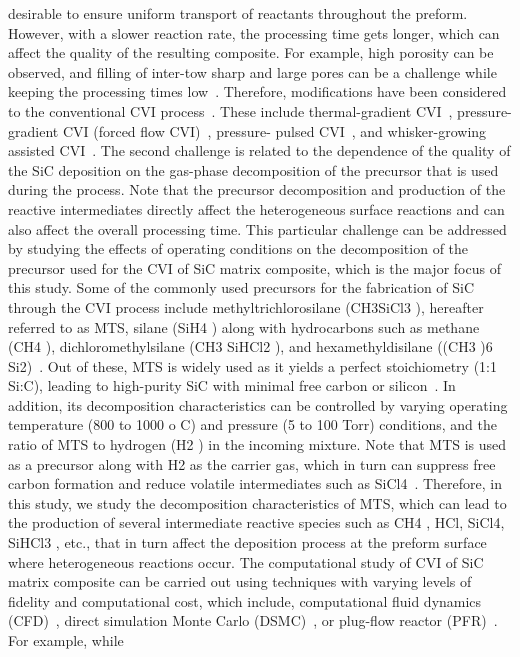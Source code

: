 \documentclass[final, letterpaper, square, comma, numbers, sort&compress]{elsarticle}
\begin{document}
desirable to ensure uniform transport of reactants throughout the preform. However, with a slower reaction
rate, the processing time gets longer, which can affect the quality of the resulting composite. For example,
high porosity can be observed, and filling of inter-tow sharp and large pores can be a challenge while keeping
the processing times low~\cite{Liu2021}. Therefore, modifications have been considered to the conventional CVI process~\cite{Lamon2005,Probst1999}. These include thermal-gradient CVI~\cite{Stinton1986}, pressure-gradient CVI (forced flow CVI)~\cite{Deck2013}, pressure-
pulsed CVI~\cite{Naslain2001}, and whisker-growing assisted CVI~\cite{Oh2001}. The second challenge is related to the dependence
of the quality of the SiC deposition on the gas-phase decomposition of the precursor that is used during the
process. Note that the precursor decomposition and production of the reactive intermediates directly affect
the heterogeneous surface reactions and can also affect the overall processing time. This particular challenge
can be addressed by studying the effects of operating conditions on the decomposition of the precursor used
for the CVI of SiC matrix composite, which is the major focus of this study.
Some of the commonly used precursors for the fabrication of SiC through the CVI process include
methyltrichlorosilane (CH3SiCl3 ), hereafter referred to as MTS, silane (SiH4 ) along with hydrocarbons such
as methane (CH4 ), dichloromethylsilane (CH3 SiHCl2 ), and hexamethyldisilane ((CH3 )6 Si2)~\cite{Noda1992,Naslain2006,Lazzeri2012}. Out
of these, MTS is widely used as it yields a perfect stoichiometry (1:1 Si:C), leading to high-purity SiC
with minimal free carbon or silicon~\cite{Lamon2005}. In addition, its decomposition characteristics can be controlled by
varying operating temperature (800 to 1000 o C) and pressure (5 to 100 Torr) conditions, and the ratio of
MTS to hydrogen (H2 ) in the incoming mixture. Note that MTS is used as a precursor along with H2 as
the carrier gas, which in turn can suppress free carbon formation and reduce volatile intermediates such as
SiCl4~\cite{Lazzeri2012}. Therefore, in this study, we study the decomposition characteristics of MTS, which can lead to
the production of several intermediate reactive species such as CH4 , HCl, SiCl4, SiHCl3 , etc., that in turn
affect the deposition process at the preform surface where heterogeneous reactions occur.
The computational study of CVI of SiC matrix composite can be carried out using techniques with
varying levels of fidelity and computational cost, which include, computational fluid dynamics (CFD)~\cite{Streitwieser2006,Ramadan2018,Cha2022,Ramanuj2022}, direct simulation Monte Carlo (DSMC)~\cite{Deck2013,Deck2012}, or plug-flow reactor (PFR)~\cite{Dang2012}. For example, while
\end{document}
